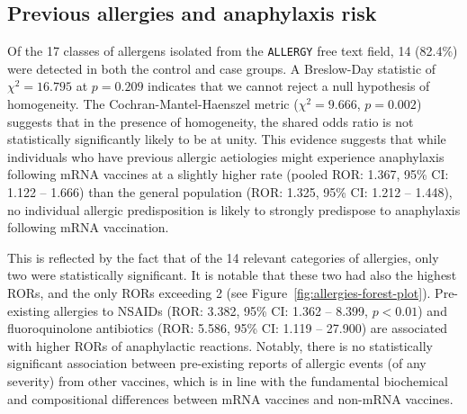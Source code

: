 \documentclass{article}
\begin{document}
\subsection{Previous allergies and anaphylaxis risk}

Of the 17 classes of allergens isolated from the \texttt{ALLERGY} free text field, 14 (82.4\%) were detected in both the control and case groups.
A Breslow-Day statistic of $\chi^2 = 16.795$ at $p = 0.209$ indicates that we cannot reject a null hypothesis of homogeneity.
The Cochran-Mantel-Haenszel metric ($\chi^2 = 9.666$, $p = 0.002$) suggests that in the presence of homogeneity, the shared odds ratio is not statistically significantly likely to be at unity.
This evidence suggests that while individuals who have previous allergic aetiologies might experience anaphylaxis following mRNA vaccines at a slightly higher rate (pooled ROR: 1.367, 95\% CI: 1.122 -- 1.666) than the general population (ROR: 1.325, 95\% CI: 1.212 -- 1.448), no individual allergic predisposition is likely to strongly predispose to anaphylaxis following mRNA vaccination.

This is reflected by the fact that of the 14 relevant categories of allergies, only two were statistically significant.
It is notable that these two had also the highest RORs, and the only RORs exceeding 2 (see Figure~\ref{fig:allergies-forest-plot}).
Pre-existing allergies to NSAIDs (ROR: 3.382, 95\% CI: 1.362 -- 8.399, $p < 0.01$) and fluoroquinolone antibiotics (ROR: 5.586, 95\% CI: 1.119 -- 27.900) are associated with higher RORs of anaphylactic reactions.
Notably, there is no statistically significant association between pre-existing reports of allergic events (of any severity) from other vaccines, which is in line with the fundamental biochemical and compositional differences between mRNA vaccines and non-mRNA vaccines.
\end{document}
